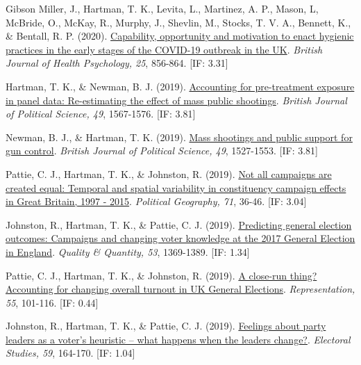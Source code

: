 \documentclass[12pt]{article}
\begin{document}
\begin{bibenum}
\item Gibson Miller, J., Hartman, T. K., Levita, L., 
	Martinez, A. P., Mason, L, McBride, O., 
	McKay, R., Murphy, J., Shevlin, M., 
	Stocks, T. V. A., Bennett, K., \& Bentall, R. P. (2020).  
	\href{https://doi.org/10.1111/bjhp.12426}{Capability, 
	opportunity and motivation to enact hygienic 
	practices in the early stages of the COVID-19 
	outbreak in the UK}. 
	\emph{British Journal of Health Psychology, 25}, 
	856-864. [IF: 3.31]
		
\item *Hartman, T. K., \& Newman, B. J. (2019). 
	\href{https://doi.org/10.1017/S0007123418000467}
	{Accounting for pre-treatment exposure in panel 
	data: Re-estimating the effect of mass 
	public shootings}. 
	\emph{British Journal of Political Science, 49}, 
	1567-1576. [IF: 3.81]

    \item *Newman, B. J., \& {Hartman, T. K.} (2019).
          \href{https://10.1017/S0007123417000333}
          {Mass shootings and public support for gun control}.
          \emph{British Journal of Political Science, 49}, 1527-1553. [IF: 3.81]
      
	\item Pattie, C. J., {Hartman, T. K.}, \& Johnston, R. (2019). 
	    \href{https://10.1016/j.polgeo.2019.02.010}
		{Not all campaigns are created equal: Temporal and spatial variability 
		in constituency campaign effects in Great Britain, 1997 - 2015}. 
	 	\emph{Political Geography, 71}, 36-46. [IF: 3.04]
	 	    
	\item Johnston, R., {Hartman, T. K.}, \& Pattie, C. J. (2019). 
		\href{https://10.1007/s11135-018-0819-1}
		{Predicting general election outcomes: Campaigns and changing voter 
		knowledge at the 2017 General Election in England}.
		\emph{Quality \& Quantity, 53}, 1369-1389. [IF: 1.34]
	 	    
    \item Pattie, C. J., {Hartman, T. K.}, \& Johnston, R. (2019).
    	\href{https://10.1080/00344893.2018.1555676}
    	{A close-run thing? Accounting for changing overall turnout in UK General Elections}.
    	\emph{Representation, 55}, 101-116. [IF: 0.44]

    \item Johnston, R., {Hartman, T. K.}, \& Pattie, C. J. (2019). 
    		\href{https://10.1016/j.electstud.2018.12.005}
    		{Feelings about party leaders as a voter's heuristic -- 
    		what happens when the leaders change?}.
        \emph{Electoral Studies, 59}, 164-170. [IF: 1.04]
          

\end{bibenum}
\end{document}
